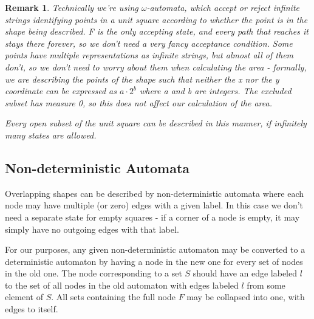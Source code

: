 \documentclass{article}
\newtheorem*{remark}{Remark}
\begin{document}
\begin{remark}
	Technically we're using $\omega$-automata, which accept or reject infinite strings identifying points in a unit square according to whether the point is in the shape being described.
	F is the only accepting state, and every path that reaches it stays there forever, so we don't need a very fancy acceptance condition.
	Some points have multiple representations as infinite strings, but almost all of them don't, so we don't need to worry about them when calculating the area - formally, we are describing the points of the shape such that neither the x nor the y coordinate can be expressed as $a \cdotp 2^b$ where a and b are integers. The excluded subset has measure 0, so this does not affect our calculation of the area.
	
	Every open subset of the unit square can be described in this manner, if infinitely many states are allowed.
\end{remark}

\subsection{Non-deterministic Automata}
Overlapping shapes can be described by non-deterministic automata where each node may have multiple (or zero) edges with a given label. In this case we don't need a separate state for empty squares - if a corner of a node is empty, it may simply have no outgoing edges with that label.

For our purposes, any given non-deterministic automaton may be converted to a deterministic automaton by having a node in the new one for every set of nodes in the old one. The node corresponding to a set $S$ should have an edge labeled $l$ to the set of all nodes in the old automaton with edges labeled $l$ from some element of $S$. All sets containing the full node $F$ may be collapsed into one, with edges to itself.

\label{sec:automaton}
\end{document}
